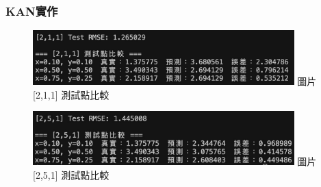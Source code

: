 \documentclass{beamer}
\begin{document}
\begin{frame}
    \frametitle{KAN實作}
    \begin{figure}
        \centering
        \begin{minipage}{\textwidth}
            \includegraphics[width=0.9\textwidth,height=0.4\textheight,keepaspectratio]{figures/211_3.jpg}
            \centering
            圖片[2,1,1] 測試點比較
        \end{minipage}
        
        \vspace{0.5em}
        
        \begin{minipage}{\textwidth}
            \includegraphics[width=0.9\textwidth,height=0.4\textheight,keepaspectratio]{figures/251.jpg}
            \centering
            圖片[2,5,1] 測試點比較
        \end{minipage}
    \end{figure}
\end{frame}
\end{document}
